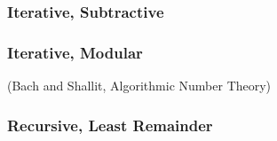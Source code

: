 \documentclass{beamer}
\begin{document}
\begin{frame}
\frametitle{Iterative, Subtractive}
\begin{algorithm}[H]
\begin{algorithmic}
\ENDIF
{}
	\ELSE
	\ENDIF
\ENDWHILE

\end{algorithmic}
\end{algorithm}
\end{frame}

\begin{frame}
\frametitle{Iterative, Modular}
\begin{algorithm}[H]
\begin{algorithmic}
\ENDIF
{}
\ENDWHILE
{}
\end{algorithmic}
\end{algorithm}
\indent (Bach and Shallit, Algorithmic Number Theory)
\end{frame}



\begin{frame}
\frametitle{Recursive, Least Remainder}
\begin{algorithm}[H]
\begin{algorithmic}
\ELSE
{}
\ENDIF

\end{algorithmic}
\end{algorithm}
\end{frame}
\end{document}
